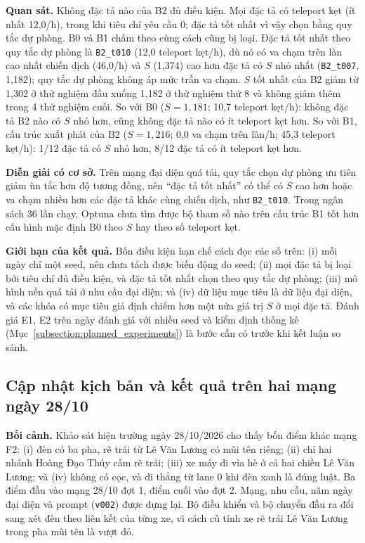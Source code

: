 \documentclass[../main.tex]{subfiles}
\begin{document}
\textbf{Quan sát.} Không đặc tả nào của B2 đủ điều kiện. Mọi đặc tả có teleport kẹt (ít nhất 12,0/h), trong khi tiêu chí yêu cầu 0; đặc tả tốt nhất vì vậy chọn bằng quy tắc dự phòng. B0 và B1 chấm theo cùng cách cũng bị loại. Đặc tả tốt nhất theo quy tắc dự phòng là \texttt{B2\_t010} (12,0 teleport kẹt/h), dù nó có va chạm trên làn cao nhất chiến dịch (46,0/h) và $S$ (1,374) cao hơn đặc tả có $S$ nhỏ nhất (\texttt{B2\_t007}, 1,182); quy tắc dự phòng không áp mức trần va chạm. $S$ tốt nhất của B2 giảm từ 1,302 ở thử nghiệm đầu xuống 1,182 ở thử nghiệm thứ 8 và không giảm thêm trong 4 thử nghiệm cuối. So với B0 ($S = 1{,}181$; 10,7 teleport kẹt/h): không đặc tả B2 nào có $S$ nhỏ hơn, cũng không đặc tả nào có ít teleport kẹt hơn. So với B1, cấu trúc xuất phát của B2 ($S = 1{,}216$; 0,0 va chạm trên làn/h; 45,3 teleport kẹt/h): 1/12 đặc tả có $S$ nhỏ hơn, 8/12 đặc tả có ít teleport kẹt hơn.

\textbf{Diễn giải có cơ sở.} Trên mạng đại diện quá tải, quy tắc chọn dự phòng ưu tiên giảm ùn tắc hơn độ tương đồng, nên ``đặc tả tốt nhất'' có thể có $S$ cao hơn hoặc va chạm nhiều hơn các đặc tả khác cùng chiến dịch, như \texttt{B2\_t010}. Trong ngân sách 36 lần chạy, Optuna chưa tìm được bộ tham số nào trên cấu trúc B1 tốt hơn cấu hình mặc định B0 theo $S$ hay theo số teleport kẹt.

\textbf{Giới hạn của kết quả.} Bốn điều kiện hạn chế cách đọc các số trên: (i) mỗi ngày chỉ một seed, nên chưa tách được biến động do seed; (ii) mọi đặc tả bị loại bởi tiêu chí đủ điều kiện, và đặc tả tốt nhất chọn theo quy tắc dự phòng; (iii) mô hình nền quá tải ở nhu cầu đại diện; và (iv) dữ liệu mục tiêu là dữ liệu đại diện, và các khóa có mục tiêu giả định chiếm hơn một nửa giá trị $S$ ở mọi đặc tả.
Đánh giá E1, E2 trên ngày đánh giá với nhiều seed và kiểm định thống kê (Mục~\ref{subsection:planned_experiments}) là bước cần có trước khi kết luận so sánh.

\subsection{Cập nhật kịch bản và kết quả trên hai mạng ngày 28/10}
\label{subsection:scenario_update}

\textbf{Bối cảnh.} Khảo sát hiện trường ngày 28/10/2026 cho thấy bốn điểm khác mạng F2: (i) đèn có ba pha, rẽ trái từ Lê Văn Lương có mũi tên riêng; (ii) chỉ hai nhánh Hoàng Đạo Thúy cấm rẽ trái; (iii) xe máy đi vỉa hè ở cả hai chiều Lê Văn Lương; và (iv) không có cọc, và đi thẳng từ lane 0 khi đèn xanh là đúng luật.
Ba điểm đầu vào mạng 28/10 đợt 1, điểm cuối vào đợt 2. Mạng, nhu cầu, năm ngày đại diện và prompt (\texttt{v002}) được dựng lại. Bộ điều khiển và bộ chuyển đầu ra đổi sang xét đèn theo liên kết của từng xe, vì cách cũ tính xe rẽ trái Lê Văn Lương trong pha mũi tên là vượt đỏ.
\end{document}
